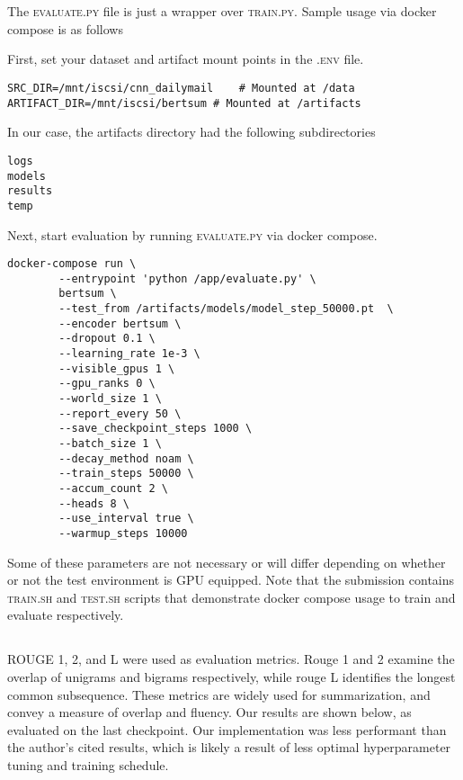 \documentclass[12pt]{article}
\begin{document}
\section{}

\subsection{}

The \textsc{evaluate.py} file is just a wrapper over
\textsc{train.py}. Sample usage via docker compose is as follows
\newline

First, set your dataset and artifact mount points in the \textsc{.env}
file.

\begin{verbatim}
SRC_DIR=/mnt/iscsi/cnn_dailymail	# Mounted at /data
ARTIFACT_DIR=/mnt/iscsi/bertsum # Mounted at /artifacts
\end{verbatim}

In our case, the artifacts directory had the following subdirectories

\begin{verbatim}
logs
models
results
temp
\end{verbatim}

Next, start evaluation by running \textsc{evaluate.py} via docker
compose.

\begin{verbatim}
docker-compose run \
		--entrypoint 'python /app/evaluate.py' \
		bertsum \
		--test_from /artifacts/models/model_step_50000.pt  \
		--encoder bertsum \
		--dropout 0.1 \
		--learning_rate 1e-3 \
		--visible_gpus 1 \
		--gpu_ranks 0 \
		--world_size 1 \
		--report_every 50 \
		--save_checkpoint_steps 1000 \
		--batch_size 1 \
		--decay_method noam \
		--train_steps 50000 \
		--accum_count 2 \
		--heads 8 \
		--use_interval true \
		--warmup_steps 10000
\end{verbatim}

Some of these parameters are not necessary or will differ depending on
whether or not the test environment is GPU equipped. Note that the
submission contains \textsc{train.sh} and \textsc{test.sh} scripts
that demonstrate docker compose usage to train and evaluate
respectively.


\subsection{}
ROUGE 1, 2, and L were used as evaluation metrics. Rouge 1 and 2
examine the overlap of unigrams and bigrams respectively, while rouge
L identifies the longest common subsequence. These metrics are widely
used for summarization, and convey a measure of overlap and fluency.
Our results are shown below, as evaluated on the last checkpoint.
Our implementation was less performant than the author's cited
results, which is likely a result of less optimal hyperparameter
tuning and training schedule.
\newline
\end{document}
